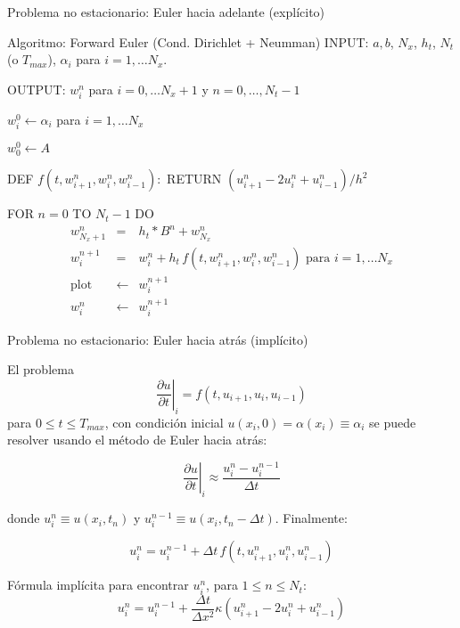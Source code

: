 \documentclass[handout]{beamer}
\begin{document}
\begin{frame}{Problema no estacionario: Euler hacia adelante (expl\'icito)}
	
	\begin{footnotesize}
		
		\begin{block}{Algoritmo: Forward Euler (Cond. Dirichlet + Neumman)}
			INPUT: $a,b$, $N_x$, $h_t$, $N_t$ (o $T_{max}$), $\alpha_i$ para $i=1,\dots N_x$.
			
			OUTPUT: $w_i^n$ para $i=0,\dots N_x+1$ y $ n = 0, \dots, N_t-1$
			
			$w_{i}^{0} \leftarrow \alpha_{i}$ para $i=1,\dots N_x$
			
			$w_0^{0} \leftarrow A$

DEF $f(t, w_{i+1}^{n}, w_{i}^{n}, w_{i-1}^{n}) : $
RETURN $\left(u_{i+1}^{n} - 2 u_{i}^{n} + u_{i-1}^{n}\right) / h^2$
			
			FOR $ n = 0$ TO $N_t-1$ DO
			\begin{eqnarray*}
				w_{N_x+1}^n & = & h_t * B^n + w_{N_x}^n \\
				w_{i}^{n+1} & = & w_{i}^{n} + h_t \, f(t, w_{i+1}^{n}, w_{i}^{n}, w_{i-1}^{n}) \text{ para } 
				i=1,\dots N_x \\
				\text{plot} & \leftarrow & w_i^{n+1} \\
				w_{i}^{n} & \leftarrow & w_{i}^{n+1}
			\end{eqnarray*}
		\end{block}
	\end{footnotesize}
	
\end{frame}


\begin{frame}{Problema no estacionario: Euler hacia atr\'as (impl\'icito)}

El problema
\[
\left.\frac{\partial u}{\partial t}\right|_i = f(t, u_{i+1}, u_{i}, u_{i-1})
\]
para $0 \leq t \leq T_{max}$, con condici\'on inicial $u(x_i, 0) = \alpha(x_i) \equiv \alpha_i$ \pause se puede resolver usando el m\'etodo de Euler hacia atr\'as:

\[
\left.\frac{\partial u}{\partial t}\right|_i  \approx \frac{u_{i}^{n} - u_{i}^{n-1}}{\Delta t}
\]

donde $u_{i}^{n} \equiv u(x_i, t_n)$ y $u_{i}^{n-1} \equiv u(x_i, t_n - \Delta t)$. \pause Finalmente:

\[
u_{i}^{n} = u_{i}^{n-1} + \Delta t \, f(t, u_{i+1}^{n}, u_{i}^{n}, u_{i-1}^{n}) 
\]

\pause

F\'ormula impl\'icita para encontrar $u_i^{n}$, para $1 \leq n \leq N_t$:
\[
\boxed{u_{i}^{n} = u_{i}^{n-1} + \frac{\Delta t}{\Delta x^2} \kappa (u_{i+1}^{n} - 2 u_{i}^{n} + u_{i-1}^{n})}
\]
\end{frame}
\end{document}
